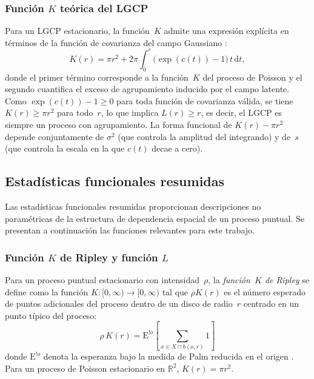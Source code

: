\documentclass[a4paper,fleqn]{cas-sc}
\numberwithin{equation}{section}
\begin{document}
\subsubsection{Funci\'on $K$ te\'orica del LGCP}

Para un LGCP estacionario, la funci\'on~$K$ admite una expresi\'on expl\'icita
en t\'erminos de la funci\'on de covarianza del campo Gaussiano
\citep{Moller1998}:
\begin{equation}
    K(r) = \pi r^2 + 2\pi\int_0^r\!\bigl(\exp(c(t))-1\bigr)\,t\,\mathrm{d}t,
    \label{eq:K_LGCP}
\end{equation}
donde el primer t\'ermino corresponde a la funci\'on~$K$ del proceso de Poisson
y el segundo cuantifica el exceso de agrupamiento inducido por el campo latente.
Como $\exp(c(t))-1\geq 0$ para toda funci\'on de covarianza v\'alida, se tiene
$K(r)\geq\pi r^2$ para todo~$r$, lo que implica $L(r)\geq r$, es decir, el LGCP
es siempre un proceso con agrupamiento. La forma funcional de $K(r)-\pi r^2$
depende conjuntamente de $\sigma^2$ (que controla la amplitud del integrando) y
de~$s$ (que controla la escala en la que $c(t)$ decae a cero).

\subsection{Estad\'isticas funcionales resumidas}
\label{sec:sumstats}

Las estad\'isticas funcionales resumidas proporcionan descripciones no
param\'etricas de la estructura de dependencia espacial de un proceso puntual.
Se presentan a continuaci\'on las funciones relevantes para este trabajo.

\subsubsection{Funci\'on $K$ de Ripley y funci\'on $L$}

Para un proceso puntual estacionario con intensidad~$\rho$, la
\emph{funci\'on~$K$ de Ripley} \citep{Ripley76, Ripley88} se define como la
funci\'on $K\colon[0,\infty)\to[0,\infty)$ tal que $\rho K(r)$ es el n\'umero
esperado de puntos adicionales del proceso dentro de un disco de radio~$r$
centrado en un punto t\'ipico del proceso:
\begin{equation}
    \rho\,K(r) = \mathrm{E}^{!o}\!\left[\sum_{x\in X\cap b(o,r)}1\right]
    \label{eq:K_def}
\end{equation}
donde $\mathrm{E}^{!o}$ denota la esperanza bajo la medida de Palm reducida en
el origen \citep{MollerWaagepetersen2004}. Para un proceso de Poisson
estacionario en $\mathbb{R}^2$, $K(r)=\pi r^2$.
\end{document}
